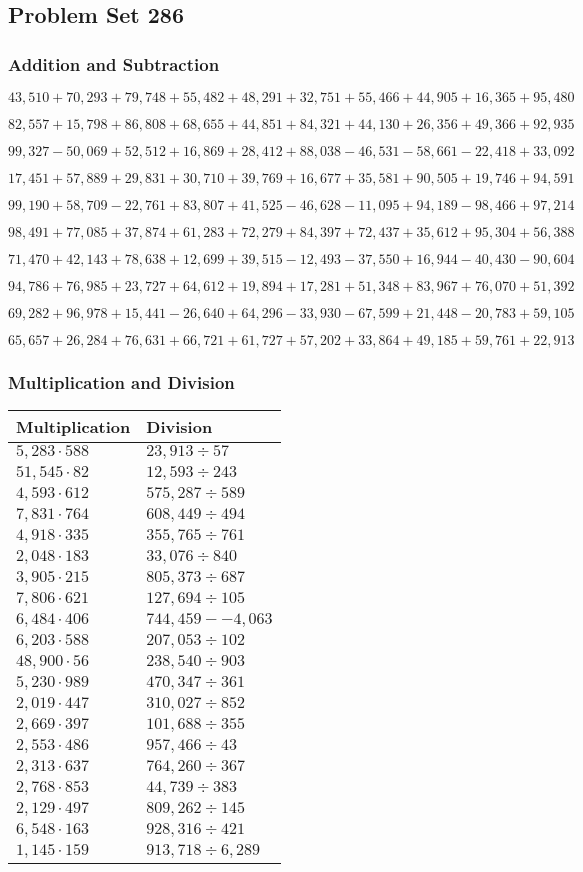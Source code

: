 \hypertarget{problem-set-286}{%
\subsection{Problem Set 286}\label{problem-set-286}}

\hypertarget{addition-and-subtraction}{%
\subsubsection{Addition and
Subtraction}\label{addition-and-subtraction}}

\(43,510+70,293+79,748+55,482+48,291+32,751+55,466+44,905+16,365+95,480\)

\(82,557+15,798+86,808+68,655+44,851+84,321+44,130+26,356+49,366+92,935\)

\(99,327-50,069+52,512+16,869+28,412+88,038-46,531-58,661-22,418+33,092\)

\(17,451+57,889+29,831+30,710+39,769+16,677+35,581+90,505+19,746+94,591\)

\(99,190+58,709-22,761+83,807+41,525-46,628-11,095+94,189-98,466+97,214\)

\(98,491+77,085+37,874+61,283+72,279+84,397+72,437+35,612+95,304+56,388\)

\(71,470+42,143+78,638+12,699+39,515-12,493-37,550+16,944-40,430-90,604\)

\(94,786+76,985+23,727+64,612+19,894+17,281+51,348+83,967+76,070+51,392\)

\(69,282+96,978+15,441-26,640+64,296-33,930-67,599+21,448-20,783+59,105\)

\(65,657+26,284+76,631+66,721+61,727+57,202+33,864+49,185+59,761+22,913\)

\hypertarget{multiplication-and-division}{%
\subsubsection{Multiplication and
Division}\label{multiplication-and-division}}

\begin{longtable}[]{@{}ll@{}}
\toprule
Multiplication & Division\tabularnewline
\midrule
\endhead
\(5,283\cdot588\) & \(23,913÷57\)\tabularnewline
\(51,545\cdot82\) & \(12,593÷243\)\tabularnewline
\(4,593\cdot612\) & \(575,287÷589\)\tabularnewline
\(7,831\cdot764\) & \(608,449÷494\)\tabularnewline
\(4,918\cdot335\) & \(355,765÷761\)\tabularnewline
\(2,048\cdot183\) & \(33,076÷840\)\tabularnewline
\(3,905\cdot215\) & \(805,373÷687\)\tabularnewline
\(7,806\cdot621\) & \(127,694÷105\)\tabularnewline
\(6,484\cdot406\) & \(744,459 -- 4,063\)\tabularnewline
\(6,203\cdot588\) & \(207,053÷102\)\tabularnewline
\(48,900\cdot56\) & \(238,540÷903\)\tabularnewline
\(5,230\cdot989\) & \(470,347÷361\)\tabularnewline
\(2,019\cdot447\) & \(310,027÷852\)\tabularnewline
\(2,669\cdot397\) & \(101,688÷355\)\tabularnewline
\(2,553\cdot486\) & \(957,466÷43\)\tabularnewline
\(2,313\cdot637\) & \(764,260÷367\)\tabularnewline
\(2,768\cdot853\) & \(44,739÷383\)\tabularnewline
\(2,129\cdot497\) & \(809,262÷145\)\tabularnewline
\(6,548\cdot163\) & \(928,316÷421\)\tabularnewline
\(1,145\cdot159\) & \(913,718÷6,289\)\tabularnewline
\bottomrule
\end{longtable}
